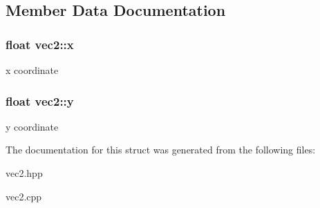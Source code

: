 \subsection{Member Data Documentation}
\hypertarget{structvec2_a002d3519d48fe3cd79729b5b0ded74bf}{
\subsubsection[{x}]{\setlength{\rightskip}{0pt plus 5cm}float vec2\-::x}}\label{structvec2_a002d3519d48fe3cd79729b5b0ded74bf}
x coordinate \hypertarget{structvec2_a6d28b12b511da692550fc9d37b4e9b1d}{
\subsubsection[{y}]{\setlength{\rightskip}{0pt plus 5cm}float vec2\-::y}}\label{structvec2_a6d28b12b511da692550fc9d37b4e9b1d}
y coordinate 

The documentation for this struct was generated from the following files\-:\begin{DoxyCompactItemize}
\item 
vec2.\-hpp\item 
vec2.\-cpp\end{DoxyCompactItemize}
